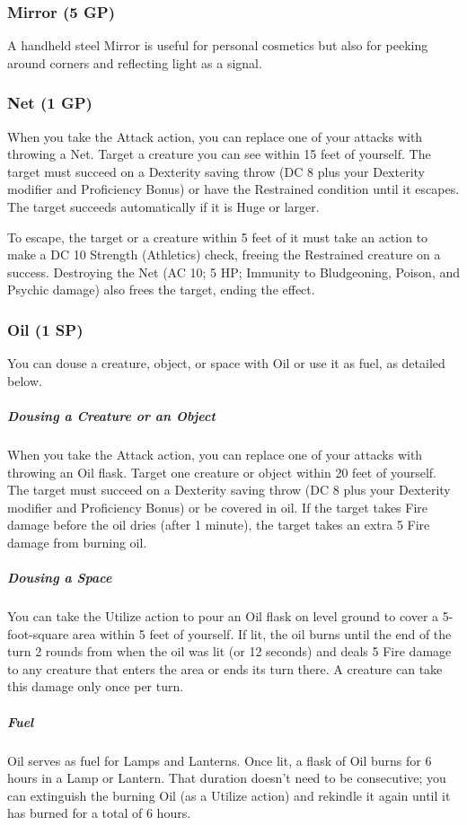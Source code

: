 \documentclass[10pt,a4paper,twoside,bg=print,twocolumn,openany,nodeprecatedcode]{dndbook}
\begin{document}
\subsubsection{Mirror (5 GP)}
A handheld steel Mirror is useful for personal cosmetics but also for peeking around corners and reflecting light as a signal.

\subsubsection{Net (1 GP)}
When you take the Attack action, you can replace one of your attacks with throwing a Net. Target a creature you can see within 15 feet of yourself. The target must succeed on a Dexterity saving throw (DC 8 plus your Dexterity modifier and Proficiency Bonus) or have the Restrained condition until it escapes. The target succeeds automatically if it is Huge or larger.

To escape, the target or a creature within 5 feet of it must take an action to make a DC 10 Strength (Athletics) check, freeing the Restrained creature on a success. Destroying the Net (AC 10; 5 HP; Immunity to Bludgeoning, Poison, and Psychic damage) also frees the target, ending the effect.

\subsubsection{Oil (1 SP)}
You can douse a creature, object, or space with Oil or use it as fuel, as detailed below.

\subparagraph{Dousing a Creature or an Object}
When you take the Attack action, you can replace one of your attacks with throwing an Oil flask. Target one creature or object within 20 feet of yourself. The target must succeed on a Dexterity saving throw (DC 8 plus your Dexterity modifier and Proficiency Bonus) or be covered in oil. If the target takes Fire damage before the oil dries (after 1 minute), the target takes an extra 5 Fire damage from burning oil.

\subparagraph{Dousing a Space}
You can take the Utilize action to pour an Oil flask on level ground to cover a 5-foot-square area within 5 feet of yourself. If lit, the oil burns until the end of the turn 2 rounds from when the oil was lit (or 12 seconds) and deals 5 Fire damage to any creature that enters the area or ends its turn there. A creature can take this damage only once per turn.

\subparagraph{Fuel}
Oil serves as fuel for Lamps and Lanterns. Once lit, a flask of Oil burns for 6 hours in a Lamp or Lantern. That duration doesn't need to be consecutive; you can extinguish the burning Oil (as a Utilize action) and rekindle it again until it has burned for a total of 6 hours.
\end{document}
